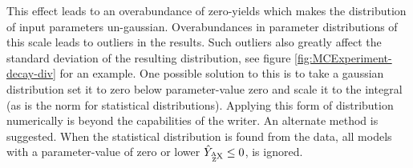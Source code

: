 This effect leads to an overabundance of zero-yields which makes the distribution of input parameters un-gaussian.
Overabundances in parameter distributions of this scale leads to outliers in the results. Such outliers also greatly affect the standard deviation of the resulting distribution, see figure \ref{fig:MCExperiment-decay-div} for an example.
One possible solution to this is to take a gaussian distribution set it to zero below parameter-value zero and scale it to the integral (as is the norm for statistical distributions).
Applying this form of distribution numerically is beyond the capabilities of the writer. An alternate method is suggested. When the statistical distribution is found from the data, all models with a parameter-value of zero or lower $\hat{Y}_{\isotope{X}{Z}{A}} \leq 0 $, is ignored. 








